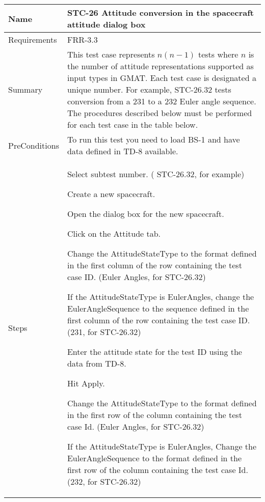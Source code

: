 \begin{table}[htbp!]
\centering
      \begin{tabular}{|p{1.0 in} |p{5.0 in} |}
         \hline
          \rowcolor[rgb]{0.8,0.8,0.8}  Name & STC-26 Attitude conversion in the spacecraft attitude dialog box\\
         \hline
         Requirements & FRR-3.3\\ \hline
         Summary & This test case represents $n(n-1)$ tests where $n$ is the number of attitude representations
         supported as input types in GMAT.  Each test case is designated a unique number.  For example,
         STC-26.32 tests conversion from a 231 to a 232 Euler angle sequence.  The procedures described below
         must be performed for each test case in the table below.   \\ \hline
         PreConditions & To run this test you need to load BS-1 and have data defined in TD-8 available.\\ \hline
         Steps &
          \begin{compactenum}
             \item Select subtest number. ( STC-26.32, for example)
             \item Create a new spacecraft.
             \item Open the dialog box for the new spacecraft.
             \item Click on the Attitude tab.
             \item Change the AttitudeStateType to the format defined in the first column of
                   the row containing the test case ID.  (Euler Angles, for STC-26.32)
             \item If the AttitudeStateType is EulerAngles, change the EulerAngleSequence to the
                   sequence defined in the first column of
                   the row containing the test case ID.  (231, for STC-26.32)
             \item Enter the attitude state for the test ID using the data from TD-8.
             \item Hit Apply.
             \item Change the AttitudeStateType to the format defined in the first row of the column containing  the test case Id. (Euler Angles, for STC-26.32)
             \item If the AttitudeStateType is EulerAngles, Change the EulerAngleSequence to the format defined in the first row of the column containing  the test case Id. (232, for STC-26.32)

\end{compactenum}
\end{tabular}
\end{table}
